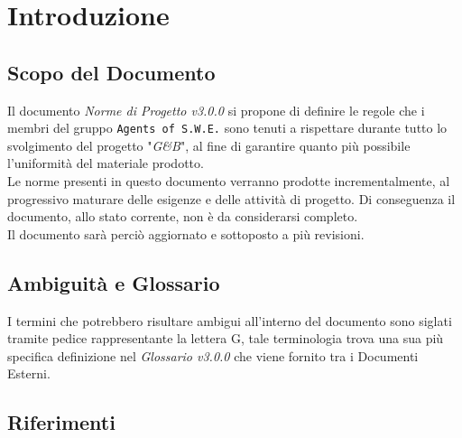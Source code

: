 \section{Introduzione}\label{Intro}

\subsection{Scopo del Documento}
Il documento \textit{Norme di Progetto v3.0.0} si propone di definire le regole che i membri del gruppo \texttt{Agents of S.W.E.} sono tenuti a rispettare durante tutto lo svolgimento del progetto "\textit{G\&B}", al fine di garantire quanto più possibile l'uniformità del materiale prodotto.\\
Le norme presenti in questo documento verranno prodotte incrementalmente, al progressivo maturare delle esigenze e delle attività di progetto. Di conseguenza il documento, allo stato corrente, non è da considerarsi completo.\\
Il documento sarà perciò aggiornato e sottoposto a più revisioni.

\subsection{Ambiguità e Glossario}
I termini che potrebbero risultare ambigui all'interno del documento sono siglati tramite pedice rappresentante la lettera \textmd{G}, tale terminologia trova una sua più specifica definizione nel \textit{Glossario v3.0.0} che viene fornito tra i Documenti Esterni.

\subsection{Riferimenti}\label{Riferimenti}
